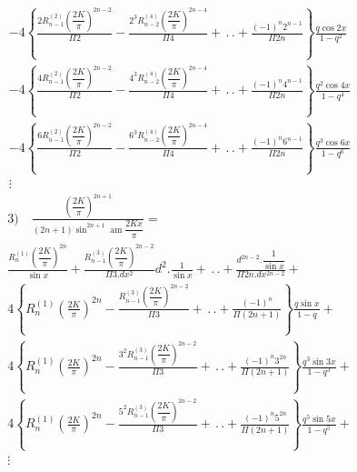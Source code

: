\documentclass{article}
\begin{document}
\[
\begin{gathered}
-4\left\{\frac{2R_{n-1}^{(2)}\left(\dfrac{2K}{\pi}\right)^{2n-2}}{\Pi 2}-\frac{2^{3}R_{n-2}^{(4)}\left(\dfrac{2K}{\pi}\right)^{2n-4}}{\Pi 4}+\,.\,.+\frac{(-1)^{n}2^{n-1}}{\Pi 2n}\right\}\frac{q\cos 2x}{1-q^{2}}\\[1.5ex]
-4\left\{\frac{4R_{n-1}^{(2)}\left(\dfrac{2K}{\pi}\right)^{2n-2}}{\Pi 2}-\frac{4^{3}R_{n-2}^{(4)}\left(\dfrac{2K}{\pi}\right)^{2n-4}}{\Pi 4}+\,.\,.+\frac{(-1)^{n}4^{n-1}}{\Pi 2n}\right\}\frac{q^{2}\cos 4x}{1-q^{4}}\\[1.5ex]
-4\left\{\frac{6R_{n-1}^{(2)}\left(\dfrac{2K}{\pi}\right)^{2n-2}}{\Pi 2}-\frac{6^{3}R_{n-2}^{(4)}\left(\dfrac{2K}{\pi}\right)^{2n-4}}{\Pi 4}+\,.\,.+\frac{(-1)^{n}6^{n-1}}{\Pi 2n}\right\}\frac{q^{3}\cos 6x}{1-q^{6}}\\[1.5ex]
\vdots
\end{gathered}
\]
\[
\begin{gathered}
\text{3)}\quad\frac{\left(\dfrac{2K}{\pi}\right)^{2n+1}}{(2n+1)\sin^{2n+1}\operatorname{am}\dfrac{2Kx}{\pi}}=\\[1.5ex]
\frac{R_{n}^{(1)}\left(\dfrac{2K}{\pi}\right)^{2n}}{\sin x}+\frac{R_{n-1}^{(3)}\left(\dfrac{2K}{\pi}\right)^{2n-2}}{\Pi 3.dx^{2}}d^{2}.\frac{1}{\sin x}+\,.\,.+\frac{d^{2n-2}.\dfrac{1}{\sin x}}{\Pi 2n.dx^{2n-2}}+\\[1.5ex]
4\left\{R_{n}^{(1)}\left(\frac{2K}{\pi}\right)^{2n}-\frac{R_{n-1}^{(3)}\left(\dfrac{2K}{\pi}\right)^{2n-2}}{\Pi 3}+\,.\,.+\frac{(-1)^{n}}{\Pi(2n+1)}\right\}\frac{q\sin x}{1-q}+\\[1.5ex]
4\left\{R_{n}^{(1)}\left(\frac{2K}{\pi}\right)^{2n}-\frac{3^{2}R_{n-1}^{(3)}\left(\dfrac{2K}{\pi}\right)^{2n-2}}{\Pi 3}+\,.\,.+\frac{(-1)^{n}3^{2n}}{\Pi(2n+1)}\right\}\frac{q^{3}\sin 3x}{1-q^{3}}+\\[1.5ex]
4\left\{R_{n}^{(1)}\left(\frac{2K}{\pi}\right)^{2n}-\frac{5^{2}R_{n-1}^{(3)}\left(\dfrac{2K}{\pi}\right)^{2n-2}}{\Pi 3}+\,.\,.+\frac{(-1)^{n}5^{2n}}{\Pi(2n+1)}\right\}\frac{q^{5}\sin 5x}{1-q^{5}}+\\[1.5ex]
\vdots
\end{gathered}
\]
\end{document}
